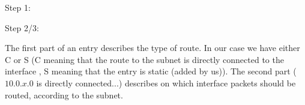 Step 1:


Step 2/3:



The first part of an entry describes the type of route. In our case we have either C or S
(C meaning that the route to the subnet is directly connected to the interface , S meaning
that the entry is static (added by us)). The second part ($10.0.x.0$ is directly connected...) describes on which interface packets should be routed, according to the subnet.